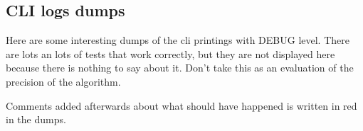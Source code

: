 \pagestyle{appendix}
\renewcommand*{\thepage}{A\arabic{page}}
\begin{appendices}
\chapter{CLI logs dumps}\thispagestyle{appendix}\label{section:cli-dumps}
Here are some interesting dumps of the \acrshort{cli} printings with DEBUG level. There are lots an lots of tests that work correctly, but they are not displayed here because there is nothing to say about it. Don't take this as an evaluation of the precision of the algorithm.

Comments added afterwards about what should have happened is written in red in the dumps.

\section{}\label{section:a1}

\section{}\label{section:a2}

\section{}\label{section:a3}

\section{}\label{section:a4}

\section{}\label{section:a5}


\end{appendices}
\label{AlmostVeryLastPage}
\clearpage
{}
\pagestyle{references}
\renewcommand*{\thepage}{B\arabic{page}}

\nocite{*}

